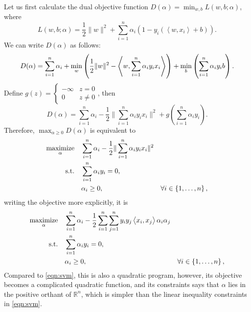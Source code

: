 \documentclass{article}
\DeclareMathOperator*{\maximize}{{\rm maximize}}
\DeclareMathOperator*{\minimize}{{\rm minimize}}
\DeclareMathOperator*{\st}{{\rm s.t.}}
\newcommand{\RR}{\mathbb{R}} %
\newcommand{\inner}[2]{\left\langle #1,#2 \right\rangle}
\begin{document}
Let us first calculate the dual objective function $D(\alpha) = \min_{w,b} L(w,b;\alpha)$, where
\[ L(w,b;\alpha) = \frac 1 2 \| w \|^2 + \sum_{i=1}^n \alpha_i (1 - y_i(\inner{w}{x_i} + b)). \]
We can write $D(\alpha)$ as follows:
\[ D(\alpha) = \sum_{i=1}^n \alpha_i + \min_w\del{\frac 1 2 \| w \|^2 - \inner{w}{\sum_{i=1}^n \alpha_i y_i x_i}} + \min_b \del{\sum_{i=1}^n \alpha_i y_i b}. \]
Define $g(z) = \begin{cases} -\infty & z = 0 \\ 0 & z \neq 0 \end{cases}$, then
\[ D(\alpha) = \sum_{i=1}^n \alpha_i - \frac{1}{2}\| \sum_{i=1}^n \alpha_i y_i x_i \|^2 + g(\sum_{i=1}^n \alpha_i y_i). \]
Therefore, $\max_{\alpha \geq 0} D(\alpha)$ is equivalent to
\begin{align}
  \maximize_{\alpha} \quad & \sum_{i=1}^n \alpha_i - \frac{1}{2} \|\sum_{i=1}^n \alpha_i y_i x_i\|^2 & \label{eqn:svm-dual-unexp} \\
    \st \quad & \sum_{i=1}^n \alpha_i y_i = 0, \nonumber \\
     & \alpha_i \geq 0, &\forall i \in \cbr{1,\ldots,n}, \nonumber
\end{align}
writing the objective more explicitly, it is
\begin{align}
  \maximize_{\alpha} \quad & \sum_{i=1}^n \alpha_i - \frac{1}{2} \sum_{i=1}^n \sum_{j=1}^n y_i y_j \inner{x_i}{x_j} \alpha_i \alpha_j & \label{eqn:svm-dual} \\
   \st \quad & \sum_{i=1}^n \alpha_i y_i = 0, \nonumber \\
     &  \alpha_i \geq 0, &\forall i \in \cbr{1,\ldots,n}, \nonumber
\end{align}
Compared to \eqref{eqn:svm}, this is also a quadratic program, however, its objective becomes a complicated quadratic function, and its constraints says that $\alpha$ lies in the positive orthant of $\RR^n$, which is simpler than the linear inequality constraints in \eqref{eqn:svm}.
\end{document}
